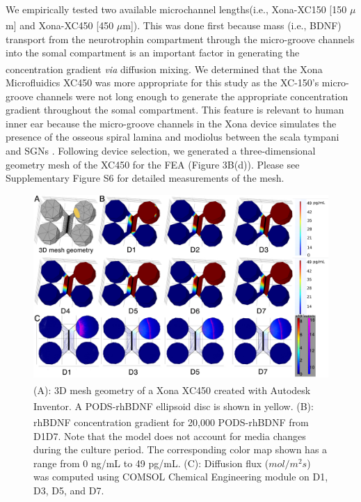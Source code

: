 \documentclass[review]{elsarticle}
\begin{document}
\indent We empirically tested two available microchannel lengths\textemdash (i.e., Xona\textsuperscript{\texttrademark}-XC150 [150 $\mu$m] and Xona\textsuperscript{\texttrademark}-XC450 [450 $\mu$m]). This was done first because mass (i.e., BDNF) transport from the neurotrophin compartment through the micro-groove channels into the somal compartment is an important factor in generating the concentration gradient \textit{via} diffusion mixing.  We determined that the Xona\textsuperscript{\texttrademark} Microfluidics XC450 was more appropriate for this study as the XC-150's micro-groove channels were not long enough to generate the appropriate concentration gradient throughout the somal compartment. This feature is relevant to human inner ear because the micro-groove channels in the Xona device simulates the presence of the osseous spiral lamina and modiolus between the scala tympani and SGNs  \cite{Tuncel2005,Kucuk1991a}. Following device selection, we generated a three-dimensional geometry mesh of the XC450 for the FEA (Figure 3B(d)). Please see Supplementary Figure S6 for detailed measurements of the mesh. 

\begin{figure}
\begin{center}
	\includegraphics[width=13cm]{Fig_5.jpg}
\end{center}
\caption{(A): 3D mesh geometry of a Xona\textsuperscript{\texttrademark} XC450 created with Autodesk Inventor. A PODS\textsuperscript{\textregistered}-rhBDNF ellipsoid disc is shown in yellow. (B): rhBDNF concentration gradient for 20,000 PODS\textsuperscript{\textregistered}-rhBDNF from D1\textendash D7. Note that the model does not account for media changes during the culture period. The corresponding color map shown has a range from 0 ng/mL to 49 pg/mL. (C): Diffusion flux ($mol/m^{2}s$) was computed using COMSOL Chemical Engineering module on D1, D3, D5, and D7.}
\end{figure}
\end{document}
